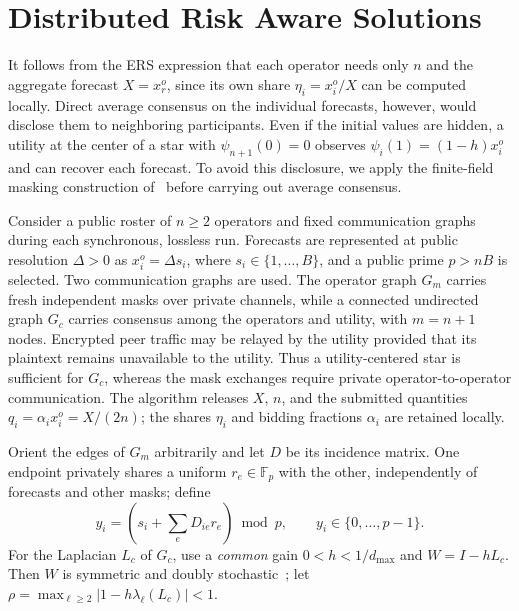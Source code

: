 \documentclass[journal]{IEEEtran}
\begin{document}
\section{Distributed Risk Aware Solutions}
\label{sec:private_consensus}

It follows from the ERS expression that each operator needs only $n$ and the aggregate forecast $X=x_r^o$, since its own share $\eta_i=x_i^o/X$ can be computed locally. Direct average consensus on the individual forecasts, however, would disclose them to neighboring participants. Even if the initial values are hidden, a utility at the center of a star with $\psi_{n+1}(0)=0$ observes $\psi_i(1)=(1-h)x_i^o$ and can recover each forecast. To avoid this disclosure, we apply the finite-field masking construction of~\cite{Gupta2020PrivateConsensus} before carrying out average consensus.

Consider a public roster of $n\geq2$ operators and fixed communication graphs during each synchronous, lossless run. Forecasts are represented at public resolution $\Delta>0$ as $x_i^o=\Delta s_i$, where $s_i\in\{1,\ldots,B\}$, and a public prime $p>nB$ is selected. Two communication graphs are used. The operator graph $G_m$ carries fresh independent masks over private channels, while a connected undirected graph $G_c$ carries consensus among the operators and utility, with $m=n+1$ nodes. Encrypted peer traffic may be relayed by the utility provided that its plaintext remains unavailable to the utility. Thus a utility-centered star is sufficient for $G_c$, whereas the mask exchanges require private operator-to-operator communication. The algorithm releases $X$, $n$, and the submitted quantities $q_i=\alpha_i x_i^o=X/(2n)$; the shares $\eta_i$ and bidding fractions $\alpha_i$ are retained locally.

Orient the edges of $G_m$ arbitrarily and let $D$ be its incidence matrix. One endpoint privately shares a uniform $r_e\in\mathbb F_p$ with the other, independently of forecasts and other masks; define
\begin{equation}
 y_i=\left(s_i+\sum_e D_{ie}r_e\right)\bmod p,
 \qquad y_i\in\{0,\ldots,p-1\}. \label{eq:masked_input}
\end{equation}
For the Laplacian $L_c$ of $G_c$, use a \emph{common} gain $0<h<1/d_{\max}$ and $W=I-hL_c$. Then $W$ is symmetric and doubly stochastic~\cite{qu}; let $\rho=\max_{\ell\geq2}|1-h\lambda_\ell(L_c)|<1$.
\end{document}
